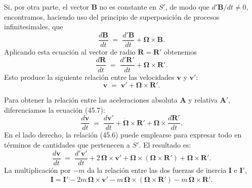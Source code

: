 \documentclass[12pt,a4paper]{book}
\begin{document}
Si, por otra parte, el vector $\mathbf{B}$ no es constante en $S'$, de modo que $d'\mathbf{B}/dt \neq 0$, encontramos, haciendo uso del principio de superposición de procesos infinitesimales, que
\begin{equation}
\frac{d\mathbf{B}}{dt} \;=\; \frac{d'\mathbf{B}}{dt} + \mathbf{\Omega} \times \mathbf{B}. \tag{45.5}
\end{equation}
Aplicando esta ecuación al vector de radio $\mathbf{R} = \mathbf{R}'$ obtenemos
\begin{equation}
\frac{d\mathbf{R}}{dt} \;=\; \frac{d'\mathbf{R}'}{dt} + \mathbf{\Omega} \times \mathbf{R}'. \tag{45.6}
\end{equation}
Esto produce la siguiente relación entre las velocidades $\mathbf{v}$ y $\mathbf{v}'$:
\begin{equation}
\mathbf{v} \;=\; \mathbf{v}' + \mathbf{\Omega} \times \mathbf{R}'. \tag{45.7}
\end{equation}

Para obtener la relación entre las aceleraciones absoluta $\mathbf{A}$ y relativa $\mathbf{A}'$, diferenciamos la ecuación (45.7):
\begin{equation}
\frac{d\mathbf{v}}{dt} \;=\; \frac{d\mathbf{v}'}{dt} + \dot{\mathbf{\Omega}} \times \mathbf{R}' + \mathbf{\Omega} \times \frac{d\mathbf{R}'}{dt}. \tag{45.8}
\end{equation}
En el lado derecho, la relación (45.6) puede emplearse para expresar todo en términos de cantidades que pertenecen a $S'$. El resultado es:
\begin{equation}
\frac{d\mathbf{v}}{dt} \;=\; \frac{d'\mathbf{v}'}{dt} + 2\,\mathbf{\Omega} \times \mathbf{v}' + \mathbf{\Omega} \times (\mathbf{\Omega} \times \mathbf{R}') + \dot{\mathbf{\Omega}} \times \mathbf{R}'. \tag{45.9}
\end{equation}
La multiplicación por $-m$ da la relación entre las dos fuerzas de inercia $\mathbf{I}$ e $\mathbf{I}'$,
\begin{equation}
\mathbf{I} = \mathbf{I}' - 2m\,\mathbf{\Omega} \times \mathbf{v}' - m\,\mathbf{\Omega} \times (\mathbf{\Omega} \times \mathbf{R}') - m\,\dot{\mathbf{\Omega}} \times \mathbf{R}'. \tag{45.10}
\end{equation}
\end{document}
